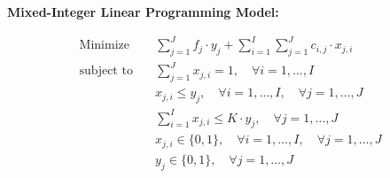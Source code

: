 \documentclass{article}
\begin{document}
\textbf{Mixed-Integer Linear Programming Model:}

\begin{align*}
    \text{Minimize} \quad & \sum_{j=1}^{J} f_j \cdot y_j + \sum_{i=1}^{I} \sum_{j=1}^{J} c_{i,j} \cdot x_{j,i} \\
    \text{subject to} \quad & \sum_{j=1}^{J} x_{j,i} = 1, \quad \forall i = 1, \ldots, I \\
    & x_{j,i} \leq y_j, \quad \forall i = 1, \ldots, I, \quad \forall j = 1, \ldots, J \\
    & \sum_{i=1}^{I} x_{j,i} \leq K \cdot y_j, \quad \forall j = 1, \ldots, J \\
    & x_{j,i} \in \{0, 1\}, \quad \forall i = 1, \ldots, I, \quad \forall j = 1, \ldots, J \\
    & y_j \in \{0, 1\}, \quad \forall j = 1, \ldots, J
\end{align*}
\end{document}

